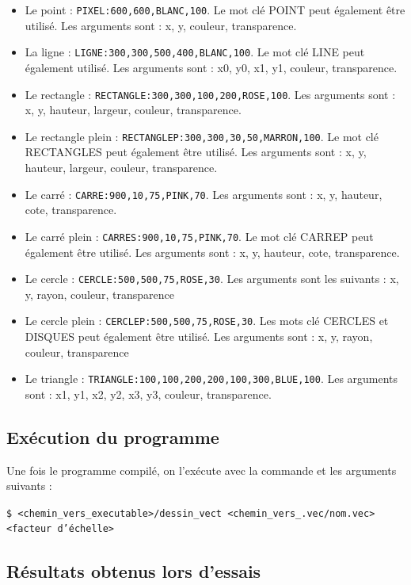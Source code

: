 \documentclass[11pt]{article}
\begin{document}
\begin{itemize}
    \item Le point : \texttt{PIXEL:600,600,BLANC,100}. Le mot clé POINT peut également être utilisé. Les arguments sont : x, y, couleur, transparence. 
    \item La ligne : \texttt{LIGNE:300,300,500,400,BLANC,100}. Le mot clé LINE peut également utilisé. Les arguments sont : x0, y0, x1, y1, couleur, transparence. 
    \item Le rectangle : \texttt{RECTANGLE:300,300,100,200,ROSE,100}. Les arguments sont : x, y, hauteur, largeur, couleur, transparence. 
    \item Le rectangle plein : \texttt{RECTANGLEP:300,300,30,50,MARRON,100}. Le mot clé RECTANGLES peut également être utilisé. Les arguments sont : x, y, hauteur, largeur, couleur, transparence. 
    \item Le carré : \texttt{CARRE:900,10,75,PINK,70}. Les arguments sont : x, y, hauteur, cote, transparence. 
    \item Le carré plein : \texttt{CARRES:900,10,75,PINK,70}. Le mot clé CARREP peut également être utilisé. Les arguments sont : x, y, hauteur, cote, transparence. 
    \item Le cercle : \texttt{CERCLE:500,500,75,ROSE,30}. Les arguments sont les suivants : x, y, rayon, couleur, transparence
    \item Le cercle plein : \texttt{CERCLEP:500,500,75,ROSE,30}. Les mots clé CERCLES et DISQUES peut également être utilisé. Les arguments sont : x, y, rayon, couleur, transparence
    \item Le triangle : \texttt{TRIANGLE:100,100,200,200,100,300,BLUE,100}. Les arguments sont : x1, y1, x2, y2, x3, y3, couleur, transparence. 
\end{itemize}

\subsection{Exécution du programme}

Une fois le programme compilé, on l’exécute avec la commande et les arguments suivants : 

\begin{center}
\texttt{\$ <chemin\_vers\_executable>/dessin\_vect <chemin\_vers\_.vec/nom.vec> <facteur d'échelle>}
\end{center}

\clearpage

\subsection{Résultats obtenus lors d'essais}
\end{document}
